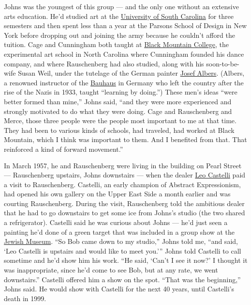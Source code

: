 Johns was the youngest of this group --- and the only one without an
extensive arts education. He'd studied art at the
\href{https://www.nytimes.com/search?query=University+of+South+Carolina}{University
of South Carolina} for three semesters and then spent less than a year
at the Parsons School of Design in New York before dropping out and
joining the army because he couldn't afford the tuition. Cage and
Cunningham both taught at
\href{https://www.nytimes.com/2015/12/18/arts/design/the-short-life-and-long-legacy-of-black-mountain-college.html}{Black
Mountain College}, the experimental art school in North Carolina where
Cunningham founded his dance company, and where Rauschenberg had also
studied, along with his soon-to-be-wife Susan Weil, under the tutelage
of the German painter
\href{https://www.nytimes.com/1976/03/26/archives/josef-albers-artist-and-teacher-dies.html}{Josef
Albers}. (Albers, a renowned instructor of the
\href{https://www.nytimes.com/2019/02/04/t-magazine/bauhaus-school-architecture-history.html}{Bauhaus}
in Germany who left the country after the rise of the Nazis in 1933,
taught ``learning by doing.'') These men's ideas ``were better formed
than mine,'' Johns said, ``and they were more experienced and strongly
motivated to do what they were doing. Cage and Rauschenberg and Merce,
those three people were the people most important to me at that time.
They had been to various kinds of schools, had traveled, had worked at
Black Mountain, which I think was important to them. And I benefited
from that. That reinforced a kind of forward movement.''

In March 1957, he and Rauschenberg were living in the building on Pearl
Street --- Rauschenberg upstairs, Johns downstairs --- when the dealer
\href{https://www.nytimes.com/1999/08/23/arts/leo-castelli-influential-art-dealer-dies-at-91.html}{Leo
Castelli} paid a visit to Rauschenberg. Castelli, an early champion of
Abstract Expressionism, had opened his own gallery on the Upper East
Side a month earlier and was courting Rauschenberg. During the visit,
Rauschenberg told the ambitious dealer that he had to go downstairs to
get some ice from Johns's studio (the two shared a refrigerator).
Castelli said he was curious about Johns --- he'd just seen a painting
he'd done of a green target that was included in a group show at the
\href{https://www.nytimes.com/topic/organization/jewish-museum-nyc}{Jewish
Museum}. ``So Bob came down to my studio,'' Johns told me, ``and said,
`Leo Castelli is upstairs and would like to meet you.''' Johns told
Castelli to call sometime and he'd show him his work. ``He said, `Can't
I see it now?' I thought it was inappropriate, since he'd come to see
Bob, but at any rate, we went downstairs.'' Castelli offered him a show
on the spot. ``That was the beginning,'' Johns said. He would show with
Castelli for the next 40 years, until Castelli's death in 1999.

